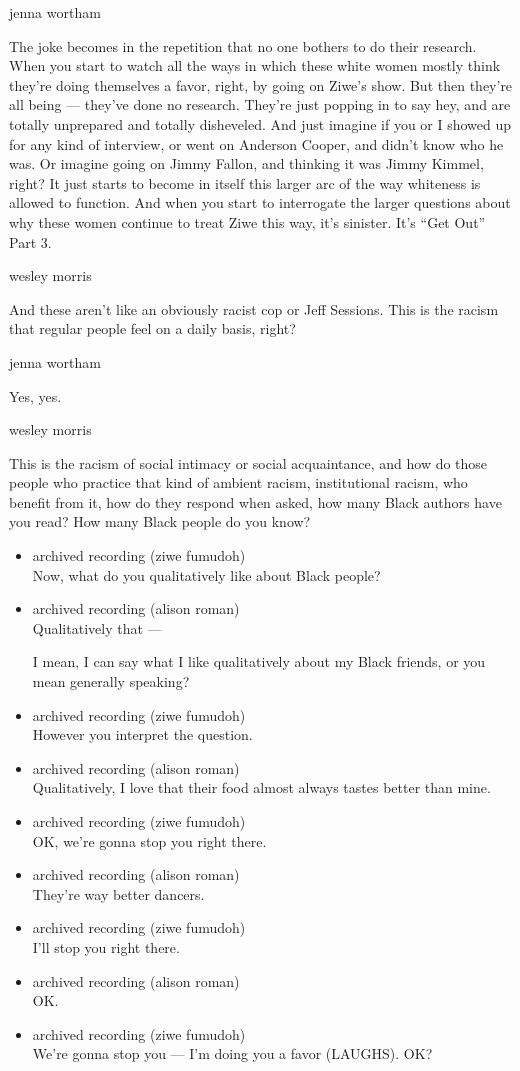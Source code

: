 jenna wortham

The joke becomes in the repetition that no one bothers to do their
research. When you start to watch all the ways in which these white
women mostly think they're doing themselves a favor, right, by going on
Ziwe's show. But then they're all being --- they've done no research.
They're just popping in to say hey, and are totally unprepared and
totally disheveled. And just imagine if you or I showed up for any kind
of interview, or went on Anderson Cooper, and didn't know who he was. Or
imagine going on Jimmy Fallon, and thinking it was Jimmy Kimmel, right?
It just starts to become in itself this larger arc of the way whiteness
is allowed to function. And when you start to interrogate the larger
questions about why these women continue to treat Ziwe this way, it's
sinister. It's ``Get Out'' Part 3.

wesley morris

And these aren't like an obviously racist cop or Jeff Sessions. This is
the racism that regular people feel on a daily basis, right?

jenna wortham

Yes, yes.

wesley morris

This is the racism of social intimacy or social acquaintance, and how do
those people who practice that kind of ambient racism, institutional
racism, who benefit from it, how do they respond when asked, how many
Black authors have you read? How many Black people do you know?

\begin{itemize}
\item
  archived recording (ziwe fumudoh)\\
  Now, what do you qualitatively like about Black people?
\item
  archived recording (alison roman)\\
  Qualitatively that ---

  I mean, I can say what I like qualitatively about my Black friends, or
  you mean generally speaking?
\item
  archived recording (ziwe fumudoh)\\
  However you interpret the question.
\item
  archived recording (alison roman)\\
  Qualitatively, I love that their food almost always tastes better than
  mine.
\item
  archived recording (ziwe fumudoh)\\
  OK, we're gonna stop you right there.
\item
  archived recording (alison roman)\\
  They're way better dancers.
\item
  archived recording (ziwe fumudoh)\\
  I'll stop you right there.
\item
  archived recording (alison roman)\\
  OK.
\item
  archived recording (ziwe fumudoh)\\
  We're gonna stop you --- I'm doing you a favor (LAUGHS). OK?
\end{itemize}

